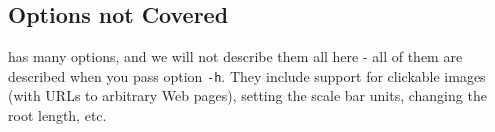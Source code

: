 \subsection{Options not Covered}

\display{} has many options, and we will not describe them all here - all of
them are described when you pass option \texttt{-h}. They include support for
clickable images (with URLs to arbitrary Web pages), setting the scale bar
units, changing the root length, etc. 

